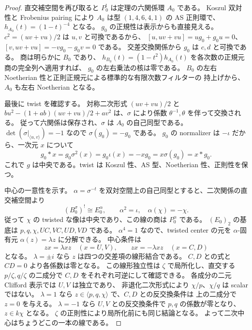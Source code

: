 \begin{proof}
直交補空間を再び取ると \(P_0^!\) は定理の六関係環 \(A_0\) である。
Koszul 双対性と Frobenius pairing により \(A_0\) は型
\((1,4,6,4,1)\) の AS 正則環で、\(h_{A_0}(t)=(1-t)^{-4}\) となる。
\(g_0\) の正規性は表示からも直接見える。
\(c^2=(uv+vu)/2\) は \(u,v\) と可換であるから、
\([u,uv+vu]=ug_0+g_0u=0\)、
\([v,uv+vu]=-vg_0-g_0v=0\) である。
交差交換関係から \(g_0\) は \(c,d\) と可換である。
商は明らかに \(B_0\) であり、
\(h_{B_0}(t)=(1-t^2)h_{A_0}(t)\) を各次数の正規元商の完全列へ適用すれば、
\(g_0\) の左右乗法の核は零である。
\(B_0\) の左右 Noetherian 性と正則正規元による標準的な有限次数フィルターの
持上げから、\(A_0\) も左右 Noetherian となる。

最後に twist を確認する。
対称二次形式 \((uv+vu)/2\) と
\(bu^2-(1+ab)(uv+vu)/2+av^2\) は、\(\sigma\) により係数
\(\theta^{-1},\theta\) を伴って交換される。
従って六関係は保存され、\(\sigma\) は \(A_0\) の自己同型である。
\(\det(\sigma|_{\langle u,v\rangle})=-1\) なので \(\sigma(g_0)=-g_0\) である。
\(g_0\) の normalizer は \(-\iota\) だから、一次元 \(x\) について
\[
 g_0*x=g_0\sigma^2(x)=g_0\iota(x)=-xg_0
             =x\sigma(g_0)=x*g_0.
\]
これで \(g\) は中央である。twist は Koszul 性、AS 型、Noetherian 性、正則性を保つ。

中心の一意性を示す。
\(\alpha=\sigma^{-t}\) を双対空間上の自己同型とすると、二次関係の直交補空間より
\[
 (B_0^\sigma)^!\cong E_0^\alpha,\qquad
 \alpha^2=\iota,\quad\alpha(\chi)=-\chi.
\]
従って \(\chi\) の twisted な像は中央であり、この線の商は \(P_0^\alpha\) である。
\((E_0)_2\) の基底は
\(p,q,\chi,UC,VC,UD,VD\) である。
\(\alpha^4=1\) なので、twisted center の元を \(\alpha\)-固有元
\(\alpha(z)=\lambda z\) に分解できる。
中心条件は
\[
 zx=\lambda xz\quad(x=U,V),\qquad
 zx=-\lambda xz\quad(x=C,D)
\]
となる。
\(\lambda=\pm i\) なら \(z\) は四つの交差項の線形結合である。
\(C,D\) との式と \(CD=0\) より各係数は零となる。
この線形独立性は \(\zeta\) で局所化し、直交する \(p/\zeta,q/\zeta\) の二成分で
\(C,D\) をそれぞれ可逆にして確認できる。
各成分の二元 Clifford 表示では \(U,V\) は独立であり、
非退化二次形式により \(\chi/p\)、\(\chi/q\) は scalar ではない。
\(\lambda=1\) なら \(z\in\langle p,q,\chi\rangle\) で、\(C,D\) との反交換条件は
上の二成分で \(z=0\) を与える。
\(\lambda=-1\) なら \(U,V\) との反交換条件で \(p,q\) の係数が零となり、
\(z\in k\chi\) となる。
\(\zeta\) の正則性により局所化前にも同じ結論となる。
よって二次中心はちょうどこの一本の線である。
\end{proof}

